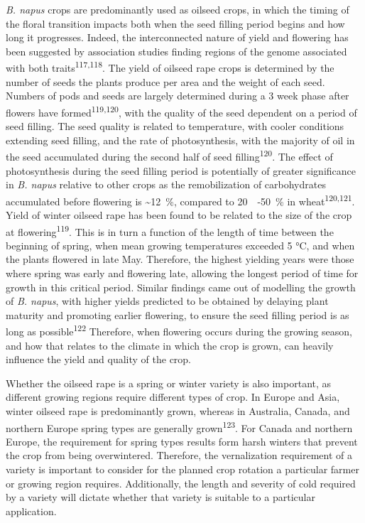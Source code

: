 \documentclass[12pt,]{book}
\begin{document}
\emph{B. napus} crops are predominantly used as oilseed crops, in which
the timing of the floral transition impacts both when the seed filling
period begins and how long it progresses. Indeed, the interconnected
nature of yield and flowering has been suggested by association studies
finding regions of the genome associated with both
traits\textsuperscript{117,118}. The yield of oilseed rape crops is
determined by the number of seeds the plants produce per area and the
weight of each seed. Numbers of pods and seeds are largely determined
during a 3 week phase after flowers have
formed\textsuperscript{119,120}, with the quality of the seed dependent
on a period of seed filling. The seed quality is related to temperature,
with cooler conditions extending seed filling, and the rate of
photosynthesis, with the majority of oil in the seed accumulated during
the second half of seed filling\textsuperscript{120}. The effect of
photosynthesis during the seed filling period is potentially of greater
significance in \emph{B. napus} relative to other crops as the
remobilization of carbohydrates accumulated before flowering is
\textasciitilde{}12~\%, compared to 20~~-50~\% in
wheat\textsuperscript{120,121}. Yield of winter oilseed rape has been
found to be related to the size of the crop at
flowering\textsuperscript{119}. This is in turn a function of the length
of time between the beginning of spring, when mean growing temperatures
exceeded 5 °C, and when the plants flowered in late May. Therefore, the
highest yielding years were those where spring was early and flowering
late, allowing the longest period of time for growth in this critical
period. Similar findings came out of modelling the growth of \emph{B.
napus}, with higher yields predicted to be obtained by delaying plant
maturity and promoting earlier flowering, to ensure the seed filling
period is as long as possible\textsuperscript{122} Therefore, when
flowering occurs during the growing season, and how that relates to the
climate in which the crop is grown, can heavily influence the yield and
quality of the crop.

Whether the oilseed rape is a spring or winter variety is also
important, as different growing regions require different types of crop.
In Europe and Asia, winter oilseed rape is predominantly grown, whereas
in Australia, Canada, and northern Europe spring types are generally
grown\textsuperscript{123}. For Canada and northern Europe, the
requirement for spring types results form harsh winters that prevent the
crop from being overwintered. Therefore, the vernalization requirement
of a variety is important to consider for the planned crop rotation a
particular farmer or growing region requires. Additionally, the length
and severity of cold required by a variety will dictate whether that
variety is suitable to a particular application.
\end{document}
